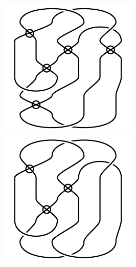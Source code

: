 \begin{figure}[H]
\begin{minipage}[b]{.18\linewidth}
\end{minipage}
\begin{minipage}[b]{.18\linewidth}
\centering
\includegraphics[width=\linewidth]{../data/virtual_4_39.png}
\end{minipage}
\begin{minipage}[b]{.18\linewidth}
\centering
\includegraphics[width=\linewidth]{../data/virtual_4_40.png}

\end{minipage}
\end{figure}
